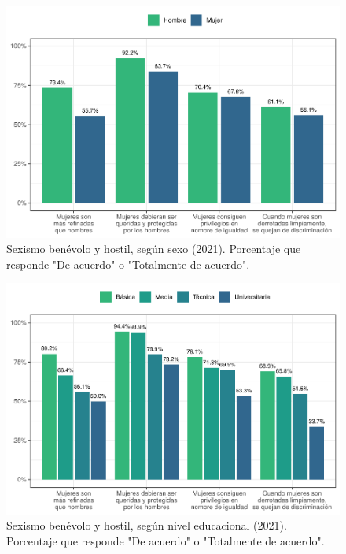 \documentclass[
  12pt,
  openany]{book}
\begin{document}
\begin{figure}

{\centering \includegraphics{reporte-elsoc_files/figure-latex/sexismo-sexo-1} 

}

\caption{Sexismo benévolo y hostil, según sexo (2021). Porcentaje que responde "De acuerdo" o "Totalmente de acuerdo".}\label{fig:sexismo-sexo}
\end{figure}

\begin{figure}

{\centering \includegraphics{reporte-elsoc_files/figure-latex/sexismo-educ-1} 

}

\caption{Sexismo benévolo y hostil, según nivel educacional (2021). Porcentaje que responde "De acuerdo" o "Totalmente de acuerdo".}\label{fig:sexismo-educ}
\end{figure}
\end{document}
